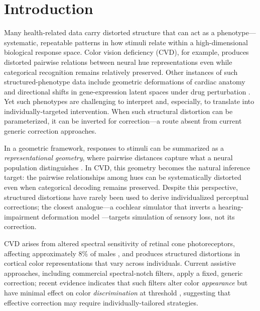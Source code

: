 \documentclass{article}
\begin{document}
\section{Introduction}
\label{sec:intro}

Many health-related data carry distorted structure that can act as a phenotype—systematic, repeatable patterns in how stimuli relate within a high-dimensional biological response space.
Color vision deficiency (CVD), for example, produces distorted pairwise relations between neural hue representations even while categorical recognition remains relatively preserved.
Other instances of such structured-phenotype data include geometric deformations of cardiac anatomy \citep{biffi2020} and directional shifts in gene-expression latent spaces under drug perturbation \citep{lotfollahi2019}.
Yet such phenotypes are challenging to interpret and, especially, to translate into individually-targeted intervention.
When such structural distortion can be parameterized, it can be inverted for correction—a route absent from current generic correction approaches.

In a geometric framework, responses to stimuli can be summarized as a \emph{representational geometry}, where pairwise distances capture what a neural population distinguishes \citep{kriegeskorte2008}.
In CVD, this geometry becomes the natural inference target: the pairwise relationships among hues can be systematically distorted even when categorical decoding remains preserved.
Despite this perspective, structured distortions have rarely been used to derive individualized perceptual corrections; the closest analogue---a cochlear simulator that inverts a hearing-impairment deformation model \citep{irino2023}---targets simulation of sensory loss, not its correction.

CVD arises from altered spectral sensitivity of retinal cone photoreceptors, affecting approximately 8\% of males \citep{machado2009}, and produces structured distortions in cortical color representations that vary across individuals.
Current assistive approaches, including commercial spectral-notch filters, apply a fixed, generic correction; recent evidence indicates that such filters alter color \emph{appearance} but have minimal effect on color \emph{discrimination} at threshold \citep{somers2024}, suggesting that effective correction may require individually-tailored strategies.
\end{document}
